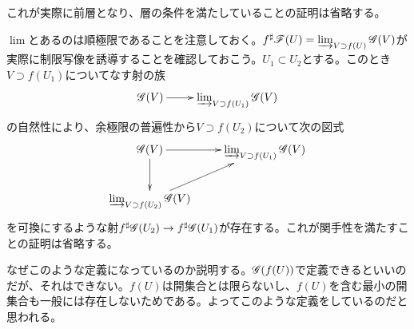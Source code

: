 \begin{rem}
これが実際に前層となり、層の条件を満たしていることの証明は省略する。
\end{rem}


\begin{rem}
$\lim$とあるのは順極限であることを注意しておく。$f^{\sharp}\mathscr{F} (U) =  \operatorname*{\varinjlim}_{V \supset f(U)} \mathscr{G}(V)$が実際に制限写像を誘導することを確認しておこう。$U_1 \subset U_2$とする。このとき$V \supset f(U_1)$についてなす射の族
\[
\xymatrix{
\scrg(V) \ar[r] & \rlim_{V \supset f(U_1)} \scrg(V)
}
\]
の自然性により、余極限の普遍性から$V \supset f(U_2)$について次の図式
\[
\xymatrix{
\scrg(V) \ar[r] \ar[d] & \rlim_{V \supset f(U_1)} \scrg(V) \\
\rlim_{V \supset f(U_2)} \scrg(V) \ar[ru] & {}
}
\]
を可換にするような射$f^{\sharp} \mathscr{G}(U_2) \to  f^{\sharp}\mathscr{G}(U_1)$が存在する。これが関手性を満たすことの証明は省略する。

なぜこのような定義になっているのか説明する。$\mathscr{G}(f(U))$で定義できるといいのだが、それはできない。$f(U)$は開集合とは限らないし、$f(U)$を含む最小の開集合も一般には存在しないためである。よってこのような定義をしているのだと思われる。
\end{rem}


\begin{comment}
\prop{
  (随伴はKan拡張) \\
  圏$\bfc$, $\bfd$と関手$F \colon \bfc \to \bfd$, $G \colon \bfd \to \bfc$があり、随伴$F \dashv G$があるとする。このとき随伴の単位射を$\eta \colon 1_{\bfc} \To GF$, 余単位射を$\ve \colon FG \To 1_{\bfd}$とすると次が成り立つ。
  \begin{description}
\item[(1)] $(G,\eta)$は$F$に沿った$1_{\bfc}$の左Kan拡張である。したがって$G \cong \Lan_F 1_{\bfc}$が成り立つ。
\[
\xymatrix{
\bfc \ar[rd]_-F \ar[rr]^-{id} & {} \ar@{}[d]|{\Downarrow \eta} & \bfc \\
{} &  \bfd \ar[ru]_{G} & {}
}
\]
\item[(2)] $(F, \ve)$は$G$に沿った$1_{\bfd}$の右Kan拡張である。したがって$F \cong \Ran_G 1_{\bfd}$が成り立つ。
\[
\xymatrix{
\bfd \ar[rd]_-G \ar[rr]^-{id} & {} \ar@{}[d]|{\Uparrow \ve} & \bfd \\
{} &  \bfc \ar[ru]_{F} & {}
}
\]
  \end{description}
}

\begin{proof}
  Riehl\cite{Riehl}命題6.5.2を参照のこと。
\end{proof}
\end{comment}



